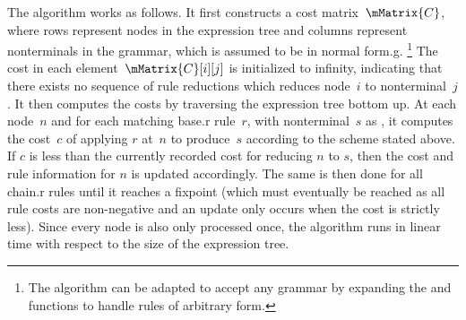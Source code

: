 \begin{algorithm}[p]
  \caption[%
            Algorithm for computing the optimal sequence of rules that reduces
            the given expression tree to a particular nonterminal%
          ]{%
            Computes the optimal sequence of rules that reduces the given
            expression tree to a particular nonterminal%
          }
\end{algorithm}

The algorithm works as follows.
%
It first constructs a cost matrix~$\mMatrix{C}$, where rows represent
\glspl{node} in the \gls{expression tree} and columns represent
\glspl{nonterminal} in the \gls{grammar}, which is assumed to be in \gls{normal
  form.g}.\!%
%
\footnote{%
  The algorithm can be adapted to accept any \gls{grammar} by expanding the
   and  functions to
  handle \glspl{rule} of arbitrary form.%
}
%
The cost in each element~\mbox{$\mMatrix{C}[i][j]$} is initialized to infinity,
indicating that there exists no sequence of \glspl{rule reduction} which reduces
\gls{node}~$i$ to \gls{nonterminal}~$j$.
%
It then computes the costs by traversing the \gls{expression tree} bottom up.
%
At each \gls{node}~$n$ and for each matching \gls{base.r} \gls{rule}~$r$, with
\gls{nonterminal}~$s$ as , it computes the cost~$c$ of
applying $r$ at~$n$ to produce~$s$ according to the scheme stated above.
%
If $c$ is less than the currently recorded cost for reducing $n$ to $s$, then
the cost and \gls{rule} information for $n$ is updated accordingly.
%
The same is then done for all \gls{chain.r} \glspl{rule} until it reaches a
fixpoint (which must eventually be reached as all \gls{rule} costs are
non-negative and an update only occurs when the cost is strictly less).
%
Since every \gls{node} is also only processed once, the algorithm runs in linear
time with respect to the size of the \gls{expression tree}.

